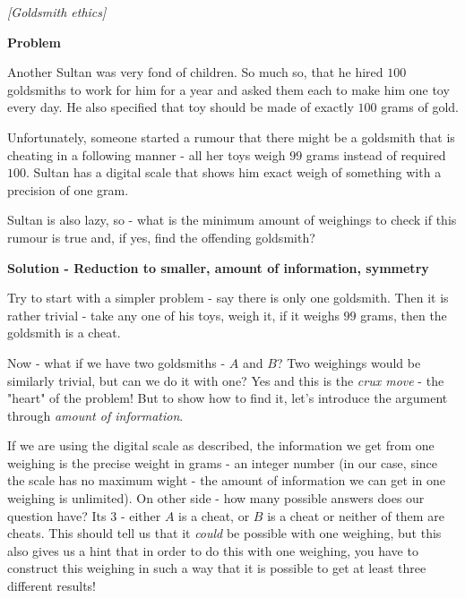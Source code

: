 
%
%
\usepackage{enumitem}


\filbreak
\begin{problem}
\textit{[Goldsmith ethics]}

\textbf{Problem}

Another Sultan was very fond of children. So much so, that he hired $100$ goldsmiths to work for him for a year and asked them each to make him one toy every day. He also specified that toy should be made of exactly $100$ grams of gold.

Unfortunately, someone started a rumour that there might be a goldsmith that is cheating in a following manner - all her toys weigh $99$ grams instead of required $100$. Sultan has a digital scale that shows him exact weigh of something with a precision of one gram. 

Sultan is also lazy, so - what is the minimum amount of weighings to check if this rumour is true and, if yes, find the offending goldsmith?

\textbf{Solution - Reduction to smaller, amount of information, symmetry}

Try to start with a simpler problem - say there is only one goldsmith. Then it is rather trivial - take any one of his toys, weigh it, if it weighs $99$ grams, then the goldsmith is a cheat.

Now - what if we have two goldsmiths - $A$ and $B$? Two weighings would be similarly trivial, but can we do it with one? Yes and this is the \textit{crux move} - the "heart" of the problem! But to show how to find it, let's introduce the argument through \textit{amount of information}.

If we are using the digital scale as described, the information we get from one weighing is the precise weight in grams - an integer number (in our case, since the scale has no maximum wight - the amount of information we can get in one weighing is unlimited). 
On other side - how many possible answers does our question have? Its $3$ - either $A$ is a cheat, or $B$ is a cheat or neither of them are cheats. This should tell us that it \textit{could} be possible with one weighing, but this also gives us a hint that in order to do this with one weighing, you have to construct this weighing in such a way that it is possible to get at least three different results! 


\end{problem}
